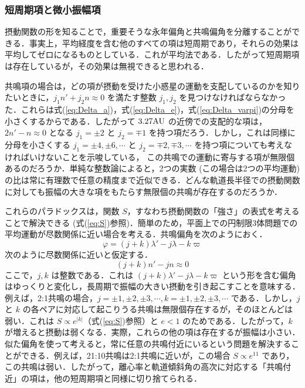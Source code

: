 \documentclass[11pt,a4paper,oneside,onecolumn]{jreport}
\begin{document}
\subsubsection{短周期項と微小振幅項}
摂動関数の形を知ることで，重要そうな永年偏角と共鳴偏角を分離することができる．事実上，平均経度を含む他のすべての項は短周期であり，それらの効果は平均してゼロになるものとしている．これが平均法である．したがって短周期項は存在しているが，その効果は無視できると思われる．

共鳴項の場合は，どの項が摂動を受けた小惑星の運動を支配しているのかを知りたいときに，$j_1 n' + j_2 n \approx 0$ を満たす整数 $j_1, j_2$ を見つけなければならなかった．これらは式(\ref{eq:Delta_a})，式(\ref{eq:Delta_e})，式(\ref{eq:Delta_varpi})の分母を小さくするからである．したがって $3.27 {\rm AU}$ の近傍での支配的な項は，$2 n' - n \approx 0$ となる $j_1 = \pm 2$ と $j_2 = \mp 1$ を持つ項だろう．しかし，これは同様に分母を小さくする $j_1 = \pm 4, \pm 6, \cdots$ と $j_2 = \mp 2, \mp 3, \cdots$ を持つ項についても考えなければいけないことを示唆している，  
この共鳴での運動に寄与する項が無限個あるのだろうか．単純な整数論によると，2つの実数 (この場合は2つの平均運動) の比は常に有理数で任意の精度まで近似できる．どんな軌道長半径での摂動関数に対しても振幅の大きな項をもたらす無限個の共鳴が存在するのだろうか．

これらのパラドックスは，関数 $S$，すなわち摂動関数の「強さ」の表式を考えることで解決できる (式(\ref{eq:S})参照)．簡単のため，平面上での円制限3体問題での平均運動が尽数関係に近い場合を考える．共鳴偏角を次のようにおく．
\begin{equation}
\varphi = (j + k) \lambda' - j \lambda - k \varpi
\end{equation}
次のように尽数関係に近いと仮定する．
\begin{equation}
(j + k) n' - j n \approx 0
\end{equation}
ここで，$j, k$ は整数である．これは $(j + k) \lambda' - j \lambda - k \varpi$ という形を含む偏角はゆっくりと変化し，長周期で振幅の大きい摂動を引き起こすことを意味する．例えば，2:1共鳴の場合，$j = \pm 1, \pm 2, \pm 3, \cdots, k = \pm 1, \pm 2, \pm 3, \cdots$ である．しかし，$j$ と $k$ の各ペアに対応して起こりうる共鳴は無限個存在するが，そのほとんどは弱い．これは $S \propto e^{|k|}$（式(\ref{eq:S})参照）と $e < 1$ のためである．したがって，$k$ が増えると摂動は弱くなる．実際，これらの他の項は存在するが振幅は小さい．似た偏角を使って考えると，常に任意の共鳴付近にいるという問題を解決することができる．例えば，21:10共鳴は2:1共鳴に近いが，この場合 $S \propto e^{11}$ であり，この共鳴は弱い．したがって，離心率と軌道傾斜角の高次に対応する「共鳴付近」の項は，他の短周期項と同様に切り捨てられる．
\end{document}
